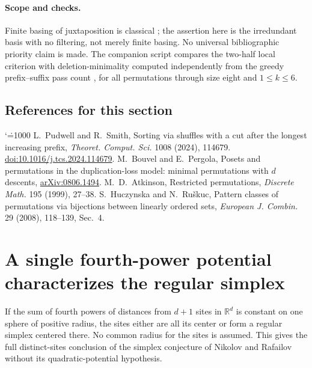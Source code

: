 \documentclass[11pt,a4paper]{article}
\makeatletter
\numberwithin{equation}{section}
\theoremstyle{definition}
\theoremstyle{remark}
\newenvironment{sectionabstract}{\par\smallskip\begingroup\small\noindent}{\par\endgroup\medskip}
\renewenvironment{thebibliography}[1]
 {\subsection*{References for this section}\small
  \list{\@biblabel{\@arabic\c@enumiv}}
       {\settowidth\labelwidth{\@biblabel{#1}}\leftmargin\labelwidth
        \advance\leftmargin\labelsep\@openbib@code
        \usecounter{enumiv}\let\p@enumiv\@empty
        \renewcommand\theenumiv{\@arabic\c@enumiv}}
  \sloppy\clubpenalty4000\widowpenalty4000\sfcode`\.=1000\relax}
 {\def\@noitemerr{\@latex@warning{Empty bibliography}}\endlist}
\makeatother
\begin{document}
\paragraph{Scope and checks.}
Finite basing of juxtaposition is classical \cite{r33reiwa:At}; the assertion here is the irredundant basis with no filtering, not merely finite basing. No universal bibliographic priority claim is made. The companion script compares the two-half local criterion with deletion-minimality computed independently from the greedy prefix--suffix pass count \cite[Thm.~3.6]{r33reiwa:PS}, for all permutations through size eight and $1\le k\le6$.
\begin{thebibliography}{9}
 L.~Pudwell and R.~Smith, Sorting via shuffles with a cut after the longest increasing prefix, \emph{Theoret. Comput. Sci.} 1008 (2024), 114679. \href{https://doi.org/10.1016/j.tcs.2024.114679}{doi:10.1016/j.tcs.2024.114679}.
 M.~Bouvel and E.~Pergola, Posets and permutations in the duplication-loss model: minimal permutations with $d$ descents, \href{https://arxiv.org/abs/0806.1494}{arXiv:0806.1494}.
 M.~D.~Atkinson, Restricted permutations, \emph{Discrete Math.} 195 (1999), 27--38.
 S.~Huczynska and N.~Ru\v{s}kuc, Pattern classes of permutations via bijections between linearly ordered sets, \emph{European J. Combin.} 29 (2008), 118--139, Sec.~4.
\end{thebibliography}

\par\endgroup

\begingroup
\newcommand{\R}{\mathbb R}
\newcommand{\norm}[1]{\lVert #1\rVert}
\section{\texorpdfstring{A single fourth-power potential characterizes the regular simplex}{A single fourth-power potential characterizes the regular simplex}}\label{section:r33keio}
\par\medskip


\begin{sectionabstract}
If the sum of fourth powers of distances from $d+1$ sites in $\mathbb R^d$ is constant on one sphere of positive radius, the sites either are all its center or form a regular simplex centered there. No common radius for the sites is assumed. This gives the full distinct-sites conclusion of the simplex conjecture of Nikolov and Rafailov without its quadratic-potential hypothesis.
\end{sectionabstract}
\end{document}
